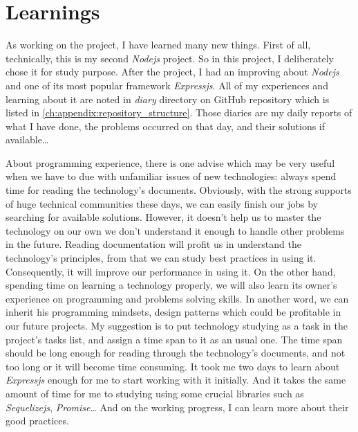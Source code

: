 \section{Learnings}

As working on the project, I have learned many new things.
First of all, technically, this is my second \emph{Nodejs} project.
So in this project, I deliberately chose it for study purpose.
After the project, I had an improving about \emph{Nodejs} and one of its most popular framework \emph{Expressjs}.
All of my experiences and learning about it are noted in \emph{diary} directory on GitHub repository which is listed in \autoref{ch:appendix:repository_structure}.
Those diaries are my daily reports of what I have done, the problems occurred on that day, and their solutions if available\dots

About programming experience, there is one advise which may be very useful when we have to due with unfamiliar issues of new technologies: always spend time for reading the technology's documents.
Obviously, with the strong supports of huge technical communities these days, we can easily finish our jobs by searching for available solutions.
However, it doesn't help us to master the technology on our own \ie we don't understand it enough to handle other problems in the future.
Reading documentation will profit us in understand the technology's principles, from that we can study best practices in using it.
Consequently, it will improve our performance in using it.
On the other hand, spending time on learning a technology properly, we will also learn its owner's experience on programming and problems solving skills.
In another word, we can inherit his programming mindsets, design patterns which could be profitable in our future projects.
My suggestion is to put technology studying as a task in the project's tasks list, and assign a time span to it as an usual one.
The time span should be long enough for reading through the technology's documents, and not too long or it will become time consuming.
It took me two days to learn about \emph{Expressjs} enough for me to start working with it initially.
And it takes the same amount of time for me to studying using some crucial libraries such as \emph{Sequelizejs}, \emph{Promise}\dots
And on the working progress, I can learn more about their good practices.

